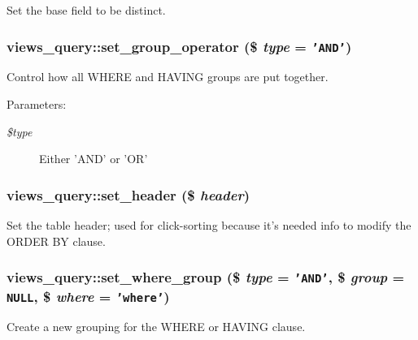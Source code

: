 Set the base field to be distinct. \hypertarget{classviews__query_8dfc6f355b29f697401f0dc7f7aa82a1}{
\subsubsection[{set\_\-group\_\-operator}]{\setlength{\rightskip}{0pt plus 5cm}views\_\-query::set\_\-group\_\-operator (\$ {\em type} = {\tt 'AND'})}}
\label{classviews__query_8dfc6f355b29f697401f0dc7f7aa82a1}


Control how all WHERE and HAVING groups are put together.

\begin{Desc}
\item[Parameters:]
\begin{description}
\item[{\em \$type}]Either 'AND' or 'OR' \end{description}
\end{Desc}
\hypertarget{classviews__query_83e8dfa6c88442e0f34b00d467f3b35e}{
\subsubsection[{set\_\-header}]{\setlength{\rightskip}{0pt plus 5cm}views\_\-query::set\_\-header (\$ {\em header})}}
\label{classviews__query_83e8dfa6c88442e0f34b00d467f3b35e}


Set the table header; used for click-sorting because it's needed info to modify the ORDER BY clause. \hypertarget{classviews__query_7c803401b485f379a93688efd7aa2886}{
\subsubsection[{set\_\-where\_\-group}]{\setlength{\rightskip}{0pt plus 5cm}views\_\-query::set\_\-where\_\-group (\$ {\em type} = {\tt 'AND'}, \/  \$ {\em group} = {\tt NULL}, \/  \$ {\em where} = {\tt 'where'})}}
\label{classviews__query_7c803401b485f379a93688efd7aa2886}


Create a new grouping for the WHERE or HAVING clause.

